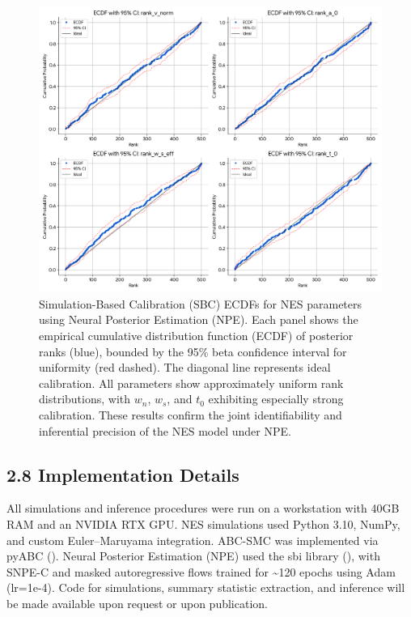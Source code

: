 \documentclass[
  11pt,
]{article}
\begin{document}
\begin{figure}
\centering
\includegraphics[width=1\linewidth,height=\textheight,keepaspectratio]{figures/NPE_SBC_ECDF_6_Param.png}
\caption{Simulation-Based Calibration (SBC) ECDFs for NES parameters
using Neural Posterior Estimation (NPE). Each panel shows the empirical
cumulative distribution function (ECDF) of posterior ranks (blue),
bounded by the 95\% beta confidence interval for uniformity (red
dashed). The diagonal line represents ideal calibration. All parameters
show approximately uniform rank distributions, with \(w_n\), \(w_s\),
and \(t_0\) exhibiting especially strong calibration. These results
confirm the joint identifiability and inferential precision of the NES
model under NPE.}\label{fig:npe_sbc}
\end{figure}

\subsection{2.8 Implementation Details}\label{implementation-details}

All simulations and inference procedures were run on a workstation with
40GB RAM and an NVIDIA RTX GPU. NES simulations used Python 3.10, NumPy,
and custom Euler--Maruyama integration. ABC-SMC was implemented via
pyABC ().
Neural Posterior Estimation (NPE) used the sbi library
(), with SNPE-C and masked autoregressive flows trained for
\textasciitilde120 epochs using Adam (lr=1e-4). Code for simulations,
summary statistic extraction, and inference will be made available upon
request or upon publication.
\end{document}
